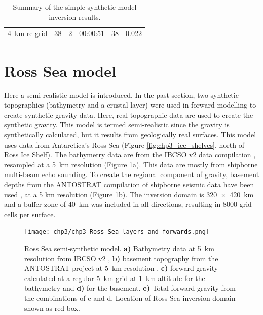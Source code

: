 \begin{table}[]
{\begin{tabular}{l|ccccc}
4~km re-grid                     & 38                                                 & 2                                                                 & 00:00:51                                                           & 38                   & 0.022                                                               
\end{tabular}%
}
\caption[Simple synthetic model summary]{Summary of the simple synthetic model inversion results.}
\label{table:chp3_simple_synthetic_stats}
\end{table}



\section{Ross Sea model} \label{chp3:Ross_Sea}

Here a semi-realistic model is introduced. In the past section, two synthetic topographies (bathymetry and a crustal layer) were used in forward modelling to create synthetic gravity data. Here, real topographic data are used to create the synthetic gravity. This model is termed semi-realistic since the gravity is synthetically calculated, but it results from geologically real surfaces. This model uses data from Antarctica's Ross Sea (Figure \ref{fig:chp3_ice_shelves}, north of Ross Ice Shelf). The bathymetry data are from the IBCSO v2 data compilation \citep{dorschelinternational2022}, resampled at a 5~km resolution (Figure \ref{fig:chp3_Ross_Sea_layers_and_forwards}a). This data are mostly from shipborne multi-beam echo sounding. To create the regional component of gravity, basement depths from the ANTOSTRAT compilation of shipborne seismic data have been used \citep{brancolinidescriptive1995}, at a 5 km resolution (Figure \ref{fig:chp3_Ross_Sea_layers_and_forwards}b). The inversion domain is 320~$\times$~420~km and a buffer zone of 40~km was included in all directions, resulting in 8000 grid cells per surface. \\

\begin{figure}[!ht]
    \centering
    \texttt{[image: chp3/chp3\_Ross\_Sea\_layers\_and\_forwards.png]}
    \caption[Ross Sea semi-synthetic model]{Ross Sea semi-synthetic model. \textbf{a)} Bathymetry data at 5~km resolution from IBCSO v2 \citep{dorschelinternational2022}, \textbf{b)} basement topography from the ANTOSTRAT project at 5~km resolution \citep{brancolinidescriptive1995}, \textbf{c)} forward gravity calculated at a regular 5~km grid at 1~km altitude for the bathymetry and \textbf{d)} for the basement. \textbf{e)} Total forward gravity from the combinations of c and d. Location of Ross Sea inversion domain shown as red box.}
    \label{fig:chp3_Ross_Sea_layers_and_forwards}
\end{figure}

